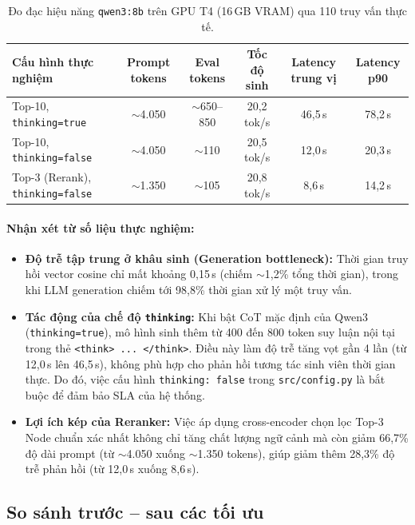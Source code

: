 \begin{table}[H]
  \centering
  \small
  \begin{tabularx}{\textwidth}{l c c c c c}
    \toprule
    \textbf{Cấu hình thực nghiệm} & \textbf{Prompt tokens} & \textbf{Eval tokens} & \textbf{Tốc độ sinh} & \textbf{Latency trung vị} & \textbf{Latency p90} \\
    \midrule
    Top-10, \texttt{thinking=true}  & $\sim$4.050 & $\sim$650--850 & 20,2 tok/s & 46,5\,s & 78,2\,s \\
    Top-10, \texttt{thinking=false} & $\sim$4.050 & $\sim$110 & 20,5 tok/s & 12,0\,s & 20,3\,s \\
    Top-3 (Rerank), \texttt{thinking=false} & $\sim$1.350 & $\sim$105 & 20,8 tok/s & 8,6\,s & 14,2\,s \\
    \bottomrule
  \end{tabularx}
  \caption{Đo đạc hiệu năng \texttt{qwen3:8b} trên GPU T4 (16\,GB VRAM) qua 110 truy vấn thực tế.}
  \label{tab:ollama-benchmark}
\end{table}

\paragraph{Nhận xét từ số liệu thực nghiệm:}
\begin{itemize}
  \item \textbf{Độ trễ tập trung ở khâu sinh (Generation bottleneck):} Thời gian truy hồi vector cosine chỉ mất khoảng 0,15\,s (chiếm $\sim$1,2\% tổng thời gian), trong khi LLM generation chiếm tới 98,8\% thời gian xử lý một truy vấn.
  \item \textbf{Tác động của chế độ \texttt{thinking}:} Khi bật CoT mặc định của Qwen3 (\texttt{thinking=true}), mô hình sinh thêm từ 400 đến 800 token suy luận nội tại trong thẻ \texttt{<think> ... </think>}. Điều này làm độ trễ tăng vọt gần 4 lần (từ 12,0\,s lên 46,5\,s), không phù hợp cho phản hồi tương tác sinh viên thời gian thực. Do đó, việc cấu hình \texttt{thinking: false} trong \texttt{src/config.py} là bắt buộc để đảm bảo SLA của hệ thống.
  \item \textbf{Lợi ích kép của Reranker:} Việc áp dụng cross-encoder chọn lọc Top-3 Node chuẩn xác nhất không chỉ tăng chất lượng ngữ cảnh mà còn giảm 66,7\% độ dài prompt (từ $\sim$4.050 xuống $\sim$1.350 tokens), giúp giảm thêm 28,3\% độ trễ phản hồi (từ 12,0\,s xuống 8,6\,s).
\end{itemize}

\subsection{So sánh trước -- sau các tối ưu}

